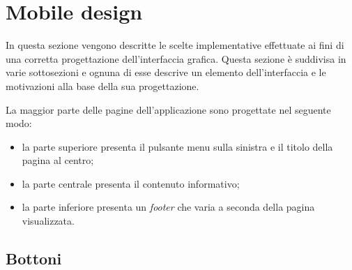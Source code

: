\documentclass[12pt, a4paper, titlepage]{report}
\begin{document}
	\section{Mobile design}
	
	In questa sezione vengono descritte le scelte implementative effettuate ai fini di una corretta progettazione dell'interfaccia grafica. Questa sezione è suddivisa in varie sottosezioni e ognuna di esse descrive un elemento dell'interfaccia e le motivazioni alla base della sua progettazione.
	\medskip
	
	\noindent La maggior parte delle pagine dell'applicazione sono progettate nel seguente modo:
	\begin{itemize}
		\item la parte superiore presenta il pulsante menu sulla sinistra e il titolo della pagina al centro;
		\item la parte centrale presenta il contenuto informativo;
		\item la parte inferiore presenta un \textit{footer} che varia a seconda della pagina visualizzata.
	\end{itemize}
	
	\subsection{Bottoni} \label{butt}
	
\end{document}
